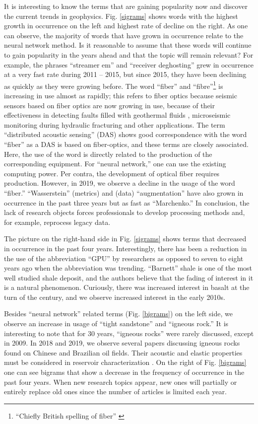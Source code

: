 \documentclass[geosciences,article,submit,moreauthors,pdftex]{Definitions/mdpi}
\begin{document}
It is interesting to know the terms that are gaining popularity now and discover the current trends in geophysics. Fig. \ref{sigrams} shows words with the highest growth in occurrence on the left and highest rate of decline on the right. As one can observe, the majority of words that have grown in occurrence relate to the neural network method. Is it reasonable to assume that these words will continue to gain popularity in the years ahead and that the topic will remain relevant? For example, the phrases ``streamer em'' and ``receiver deghosting'' grew in occurrence at a very fast rate during 2011 – 2015, but since 2015, they have been declining as quickly as they were growing before. The word ``fiber'' and ``fibre''\footnote{``Chiefly British spelling of fiber'' \citep{MW2020}} is increasing in use almost as rapidly; this refers to fiber optics because seismic sensors based on fiber optics are now growing in use, because of their effectiveness in detecting faults filled with geothermal fluids \citep{Trainor-Guitton2018}, microseismic monitoring during hydraulic fracturing \citep{Binder2019} and other applications. The term “distributed acoustic sensing” (DAS) shows good correspondence with the word “fiber” as a DAS is based on fiber-optics, and these terms are closely associated. Here, the use of the word is directly related to the production of the corresponding equipment. For ``neural network,'' one can use the existing computing power. Per contra, the development of optical fiber requires production. However, in 2019, we observe a decline in the usage of the word ``fiber.'' ``Wasserstein'' (metrics) and (data) ``augmentation'' have also grown in occurrence in the past three years but as fast as ``Marchenko.'' In conclusion, the lack of research objects forces professionals to develop processing methods and, for example, reprocess legacy data. 

The picture on the right-hand side in Fig. \ref{sigrams} shows terms that decreased in occurrence in the past four years. Interestingly, there has been a reduction in the use of the abbreviation ``GPU'' by researchers as opposed to seven to eight years ago when the abbreviation was trending. ``Barnett'' shale is one of the most well studied shale deposit, and the authors believe that the fading of interest in it is a natural phenomenon. Curiously, there was increased interest in basalt at the turn of the century, and we observe increased interest in the early 2010s.


Besides ``neural network'' related terms (Fig. \ref{bigrams}) on the left side, we observe an increase in usage of ``tight sandstone'' and ``igneous rock.'' It is interesting to note that for 30 years, ``igneous rocks'' were rarely discussed, except in 2009. In 2018 and 2019, we observe several papers discussing igneous rocks found on Chinese and Brazilian oil fields. Their acoustic and elastic properties must be considered in reservoir characterization \citep{Penna2019}. On the right of Fig. \ref{bigrams} one can see bigrams that show a decrease in the frequency of occurrence in the past four years. When new research topics appear, new ones will partially or entirely replace old ones since the number of articles is limited each year. 
\end{document}
